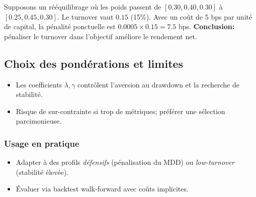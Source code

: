 \documentclass[11pt,a4paper]{article}
\begin{document}
\begin{tcolorbox}[title=Exemple — Coûts et turnover]
Supposons un rééquilibrage où les poids passent de \([0.30,0.40,0.30]\) à \([0.25,0.45,0.30]\). Le turnover vaut \(0.15\) (15\%). Avec un coût de 5 bps par unité de capital, la pénalité ponctuelle est \(0.0005\times 0.15 = 7.5\) bps. \textbf{Conclusion:} pénaliser le turnover dans l'objectif améliore le rendement net.
\end{tcolorbox}

\subsection{Choix des pondérations et limites}
\begin{itemize}
  \item Les coefficients \(\lambda,\gamma\) contrôlent l'aversion au drawdown et la recherche de stabilité.
  \item Risque de sur-contrainte si trop de métriques; préférer une sélection parcimonieuse.
\end{itemize}

\subsubsection*{Usage en pratique}
\begin{itemize}
  \item Adapter à des profils \emph{défensifs} (pénalisation du MDD) ou \emph{low-turnover} (stabilité élevée).
  \item Évaluer via backtest walk-forward avec coûts implicites.
\end{itemize}
\end{document}
